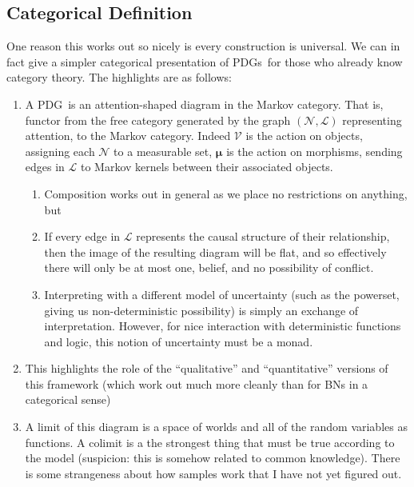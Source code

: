 \documentclass{article}
\newcommand{\MN}{PDG}
\newcommand{\MNs}{PDGs}
\newcommand\bmu{\boldsymbol{\mu}}
\begin{document}
	\begin{vcat}
		\subsection{Categorical Definition}
		One reason this works out so nicely is every construction is universal. We can in fact give a simpler categorical presentation of \MNs\ for those who already know category theory. The highlights are as follows:
		\begin{enumerate}
			\item A \MN\ is an attention-shaped diagram in the Markov category. That is, functor from the free category generated by the graph $(\mathcal N, \mathcal L)$ representing attention, to the Markov category. Indeed $\mathcal V$ is the action on objects, assigning each $\mathcal N$ to a measurable set, $\bmu$ is the action on morphisms, sending edges in $\mathcal L$ to Markov kernels between their associated objects. 
			\begin{enumerate}
				\item Composition works out in general as we place no restrictions on anything, but
				\item If every edge in $\mathcal L$ represents the causal structure of their relationship, then the image of the resulting diagram will be flat, and so effectively there will only be at most one, belief, and no possibility of conflict.
				\item Interpreting with a different model of uncertainty (such as the powerset, giving us non-deterministic possibility) is simply an exchange of interpretation. However, for nice interaction with deterministic functions and logic, this notion of uncertainty must be a monad.
			\end{enumerate}
			
			\item This highlights the role of the ``qualitative'' and ``quantitative'' versions of this framework (which work out much more cleanly than for BNs in a categorical sense)
			
			\item A limit of this diagram is a space of worlds and all of the random variables as functions. A colimit is a the strongest thing that must be true according to the model (suspicion: this is somehow related to common knowledge). There is some strangeness about how samples work that I have not yet figured out.
		\end{enumerate}
	\end{vcat}
\end{document}
